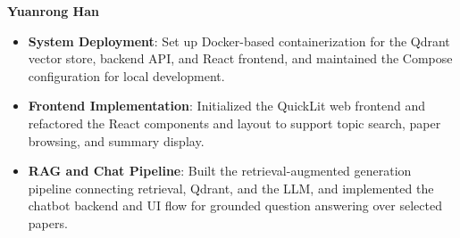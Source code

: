 \documentclass{article}
\begin{document}
\noindent\textbf{Yuanrong Han}

\begin{itemize}
    \item \textbf{System Deployment}: Set up Docker-based containerization for the Qdrant vector store, backend API, and React frontend, and maintained the Compose configuration for local development.
    \item \textbf{Frontend Implementation}: Initialized the QuickLit web frontend and refactored the React components and layout to support topic search, paper browsing, and summary display.
    \item \textbf{RAG and Chat Pipeline}: Built the retrieval-augmented generation pipeline connecting retrieval, Qdrant, and the LLM, and implemented the chatbot backend and UI flow for grounded question answering over selected papers.
\end{itemize}



\end{document}
